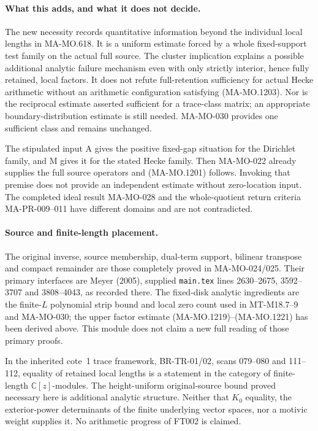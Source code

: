 \paragraph{What this adds, and what it does not decide.}
The new necessity records quantitative information beyond the
individual local lengths in MA-MO.618.  It is a uniform estimate forced by a
whole fixed-support test family on the actual full source.
The cluster implication explains a possible additional analytic
failure mechanism even with only strictly interior, hence fully
retained, local factors.  It does not refute full-retention
sufficiency for actual Hecke arithmetic without an arithmetic
configuration satisfying (MA-MO.1203).  Nor is the reciprocal
estimate asserted sufficient for a trace-class matrix; an
appropriate boundary-distribution estimate is still needed.
MA-MO-030 provides one sufficient class and remains unchanged.

The stipulated input A gives the positive fixed-gap situation for
the Dirichlet family, and M gives it for the stated Hecke family.
Then MA-MO-022 already supplies the full source operators and
(MA-MO.1201) follows.  Invoking that premise does not provide an
independent estimate without zero-location input.  The completed
ideal result MA-MO-028 and the whole-quotient return criteria
MA-PR-009--011 have different domains and are not contradicted.

\paragraph{Source and finite-length placement.}
The original inverse, source membership, dual-term support,
bilinear transpose and compact remainder are those completely
proved in MA-MO-024/025.  Their primary interfaces are Meyer
(2005), supplied \texttt{main.tex} lines 2630--2675,
3592--3707 and 3808--4043, as recorded there.
The fixed-disk analytic ingredients are the finite-$L$ polynomial
strip bound and local zero count used in MT-M18.7--9 and
MA-MO-030; the upper factor estimate (MA-MO.1219)--(MA-MO.1221)
has been derived above.  This module does not claim a new full
reading of those primary proofs.

In the inherited cote~1 trace framework, BR-TR-01/02,
scans 079--080 and 111--112, equality of retained local lengths
is a statement in the category of finite-length
$\mathbb C[z]$-modules.  The height-uniform original-source
bound proved necessary here is additional analytic structure.
Neither that $K_0$ equality, the exterior-power determinants
of the finite underlying vector spaces, nor a motivic weight
supplies it.  No arithmetic progress of FT002 is claimed.
